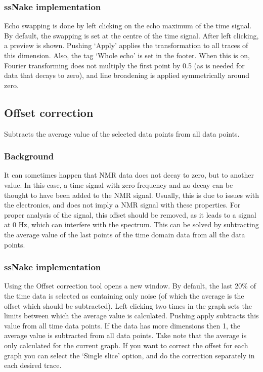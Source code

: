 \documentclass[11pt,a4paper]{article}
\begin{document}
\subsubsection*{ssNake implementation}
Echo swapping is done by left clicking on the echo maximum of the time signal. By default, the swapping is set at the centre of the time signal. After left clicking, a preview is shown. Pushing `Apply' applies the transformation to all traces of this dimension. Also, the tag `Whole echo' is set in the footer. When this is on, Fourier transforming does not multiply the first point by 0.5 (as is needed for data that decays to zero), and line broadening is applied symmetrically around zero.


\subsection{Offset correction}
Subtracts the average value of the selected data points from all data points.

\subsubsection*{Background}
It can sometimes happen that NMR data does not decay to zero, but to another value. In this case, a time signal with zero frequency and no decay can be thought to have been added to the NMR signal. Usually, this is due to issues with the electronics, and does not imply a NMR signal with these properties. For proper analysis of the signal, this offset should be removed, as it leads to a signal at 0 Hz, which can interfere with the spectrum. This can be solved by subtracting the average value of the last points of the time domain data from all the data points.

\subsubsection*{ssNake implementation}
Using the Offset correction tool opens a new window. By default, the last 20\% of the time data is selected as containing only noise (of which the average is the offset which should be subtracted). Left clicking two times in the graph sets the limits between which the average value is calculated. Pushing apply subtracts this value from all time data points. If the data has more dimensions then 1, the average value is subtracted from all data points. Take note that the average is only calculated for the current graph. If you want to correct the offset for each graph you can select the `Single slice' option, and do the correction separately in each desired trace.
\end{document}

